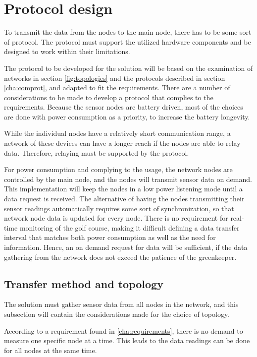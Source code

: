 \section{Protocol design}\label{cha:protocolDesign}
To transmit the data from the nodes to the main node, there has to be some sort of protocol. The protocol must support the utilized hardware components and be designed to work within their limitations. 

The protocol to be developed for the solution will be based on the examination of networks in section \ref{fig:topologies} and the protocols described in section \ref{cha:comprot}, and adapted to fit the requirements. There are a number of considerations to be made to develop a protocol that complies to the requirements. Because the sensor nodes are battery driven, most of the choices are done with power consumption as a priority, to increase the battery longevity.

While the individual nodes have a relatively short communication range, a network of these devices can have a longer reach if the nodes are able to relay data. Therefore, relaying must be supported by the protocol. 

For power consumption and complying to the usage, the network nodes are controlled by the main node, and the nodes will transmit sensor data on demand. This implementation will keep the nodes in a low power listening mode until a data request is received. 
The alternative of having the nodes transmitting their sensor readings automatically requires some sort of synchronization, so that network node data is updated for every node. There is no requirement for real-time monitoring of the golf course, making it difficult defining a data transfer interval that matches both power consumption as well as the need for information. Hence, an on demand request for data will be sufficient, if the data gathering from the network does not exceed the patience of the greenkeeper.

\subsection{Transfer method and topology}
The solution must gather sensor data from all nodes in the network, and this subsection will contain the considerations made for the choice of topology.

According to a requirement found in \ref{cha:requirements}, there is no demand to measure one specific node at a time. This leads to the data readings can be done for all nodes at the same time. 

